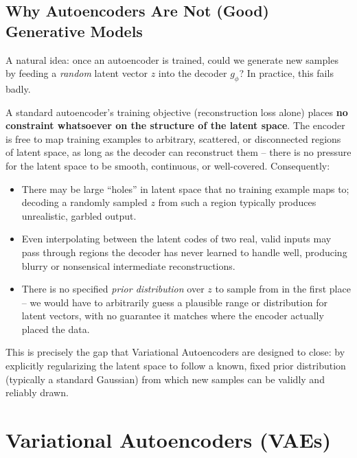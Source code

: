 \documentclass[12pt,a4paper]{article}
\begin{document}
\subsection{Why Autoencoders Are Not (Good) Generative Models}

A natural idea: once an autoencoder is trained, could we generate new samples by feeding a \emph{random} latent vector $z$ into the decoder $g_\phi$? In practice, this fails badly.

\begin{keyidea}
A standard autoencoder's training objective (reconstruction loss alone) places \textbf{no constraint whatsoever on the structure of the latent space}. The encoder is free to map training examples to arbitrary, scattered, or disconnected regions of latent space, as long as the decoder can reconstruct them -- there is no pressure for the latent space to be smooth, continuous, or well-covered. Consequently:
\begin{itemize}[leftmargin=1.5em]
    \item There may be large ``holes'' in latent space that no training example maps to; decoding a randomly sampled $z$ from such a region typically produces unrealistic, garbled output.
    \item Even interpolating between the latent codes of two real, valid inputs may pass through regions the decoder has never learned to handle well, producing blurry or nonsensical intermediate reconstructions.
    \item There is no specified \emph{prior distribution} over $z$ to sample from in the first place -- we would have to arbitrarily guess a plausible range or distribution for latent vectors, with no guarantee it matches where the encoder actually placed the data.
\end{itemize}
This is precisely the gap that Variational Autoencoders are designed to close: by explicitly regularizing the latent space to follow a known, fixed prior distribution (typically a standard Gaussian) from which new samples can be validly and reliably drawn.
\end{keyidea}

\newpage

\section{Variational Autoencoders (VAEs)}
\end{document}
